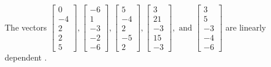 \begin{exercise}
\begin{exerciseStatement}
  \end{exerciseStatement}
  \begin{exerciseAnswer}
   The vectors \(\left[\begin{array}{r}
0 \\
-4 \\
2 \\
2 \\
5
\end{array}\right] , \left[\begin{array}{r}
-6 \\
1 \\
-3 \\
-2 \\
-6
\end{array}\right] , \left[\begin{array}{r}
5 \\
-4 \\
2 \\
-5 \\
2
\end{array}\right] , \left[\begin{array}{r}
3 \\
21 \\
-3 \\
15 \\
-3
\end{array}\right] , \text{ and } \left[\begin{array}{r}
3 \\
5 \\
-3 \\
-4 \\
-6
\end{array}\right]\) are 
  	 linearly dependent  .
  


  \end{exerciseAnswer}
\end{exercise}